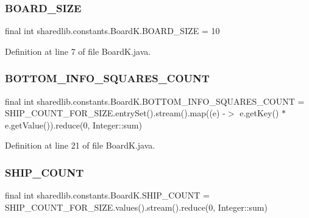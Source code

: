 \subsubsection{\texorpdfstring{B\+O\+A\+R\+D\+\_\+\+S\+I\+ZE}{BOARD\_SIZE}}
{\footnotesize\ttfamily final int sharedlib.\+constants.\+Board\+K.\+B\+O\+A\+R\+D\+\_\+\+S\+I\+ZE = 10\hspace{0.3cm}{\ttfamily [static]}}



Definition at line 7 of file Board\+K.\+java.

\hypertarget{classsharedlib_1_1constants_1_1_board_k_a8d50e08738e1f560369f120ab7d66a31}{}\label{classsharedlib_1_1constants_1_1_board_k_a8d50e08738e1f560369f120ab7d66a31} 
\subsubsection{\texorpdfstring{B\+O\+T\+T\+O\+M\+\_\+\+I\+N\+F\+O\+\_\+\+S\+Q\+U\+A\+R\+E\+S\+\_\+\+C\+O\+U\+NT}{BOTTOM\_INFO\_SQUARES\_COUNT}}
{\footnotesize\ttfamily final int sharedlib.\+constants.\+Board\+K.\+B\+O\+T\+T\+O\+M\+\_\+\+I\+N\+F\+O\+\_\+\+S\+Q\+U\+A\+R\+E\+S\+\_\+\+C\+O\+U\+NT = S\+H\+I\+P\+\_\+\+C\+O\+U\+N\+T\+\_\+\+F\+O\+R\+\_\+\+S\+I\+Z\+E.\+entry\+Set().stream().map((e) -\/$>$ e.\+get\+Key() $\ast$ e.\+get\+Value()).reduce(0, Integer\+::sum)\hspace{0.3cm}{\ttfamily [static]}}



Definition at line 21 of file Board\+K.\+java.

\hypertarget{classsharedlib_1_1constants_1_1_board_k_a7b90dc391ec795dbaac068c611dd9787}{}\label{classsharedlib_1_1constants_1_1_board_k_a7b90dc391ec795dbaac068c611dd9787} 
\subsubsection{\texorpdfstring{S\+H\+I\+P\+\_\+\+C\+O\+U\+NT}{SHIP\_COUNT}}
{\footnotesize\ttfamily final int sharedlib.\+constants.\+Board\+K.\+S\+H\+I\+P\+\_\+\+C\+O\+U\+NT = S\+H\+I\+P\+\_\+\+C\+O\+U\+N\+T\+\_\+\+F\+O\+R\+\_\+\+S\+I\+Z\+E.\+values().stream().reduce(0, Integer\+::sum)\hspace{0.3cm}{\ttfamily [static]}}



